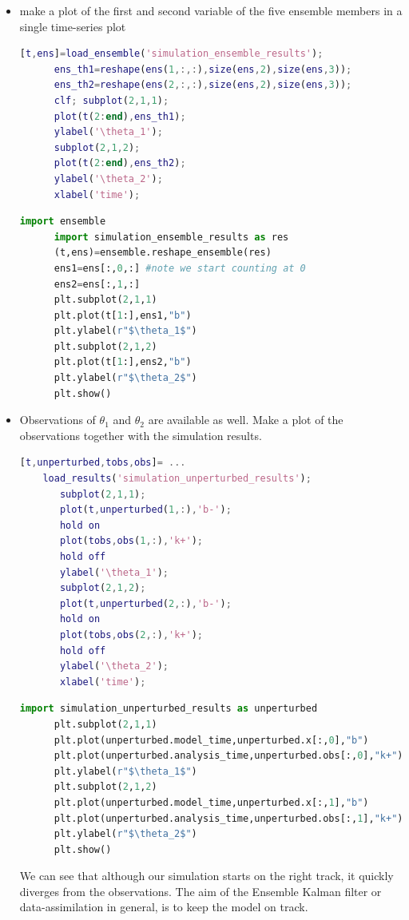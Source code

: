 \begin{itemize}
\begin{itemize}
      \item make a plot of the first and second variable of the five ensemble
      members in a single time-series plot
\ifshowmatlab
      \begin{lstlisting}[language=Matlab,frame=single,caption={Matlab}]
      [t,ens]=load_ensemble('simulation_ensemble_results');
      ens_th1=reshape(ens(1,:,:),size(ens,2),size(ens,3));
      ens_th2=reshape(ens(2,:,:),size(ens,2),size(ens,3));
      clf; subplot(2,1,1);
      plot(t(2:end),ens_th1);
      ylabel('\theta_1');
      subplot(2,1,2);
      plot(t(2:end),ens_th2);
      ylabel('\theta_2');
      xlabel('time');
      \end{lstlisting}
\fi
     
      \begin{lstlisting}[language=Python,frame=single,caption={Python}]
      import ensemble
      import simulation_ensemble_results as res
      (t,ens)=ensemble.reshape_ensemble(res)
      ens1=ens[:,0,:] #note we start counting at 0
      ens2=ens[:,1,:]
      plt.subplot(2,1,1)
      plt.plot(t[1:],ens1,"b")
      plt.ylabel(r"$\theta_1$")
      plt.subplot(2,1,2)
      plt.plot(t[1:],ens2,"b")
      plt.ylabel(r"$\theta_2$")
      plt.show()
      \end{lstlisting}
      
      \item Observations of $\theta_1$ and $\theta_2$ are available as well. Make a plot of
      the observations together with the simulation results.
\ifshowmatlab
      \begin{lstlisting}[language=Matlab,frame=single,caption={Matlab}]
	[t,unperturbed,tobs,obs]= ...
	load_results('simulation_unperturbed_results');
       subplot(2,1,1);
       plot(t,unperturbed(1,:),'b-');
       hold on
       plot(tobs,obs(1,:),'k+');
       hold off
       ylabel('\theta_1');
       subplot(2,1,2);
       plot(t,unperturbed(2,:),'b-');
       hold on
       plot(tobs,obs(2,:),'k+');
       hold off
       ylabel('\theta_2');
       xlabel('time');
      \end{lstlisting}
\fi
      \begin{lstlisting}[language=Python,frame=single,caption={Python}]
      import simulation_unperturbed_results as unperturbed
      plt.subplot(2,1,1)
      plt.plot(unperturbed.model_time,unperturbed.x[:,0],"b") 
      plt.plot(unperturbed.analysis_time,unperturbed.obs[:,0],"k+")
      plt.ylabel(r"$\theta_1$")
      plt.subplot(2,1,2)
      plt.plot(unperturbed.model_time,unperturbed.x[:,1],"b")
      plt.plot(unperturbed.analysis_time,unperturbed.obs[:,1],"k+")
      plt.ylabel(r"$\theta_2$")
      plt.show()
      \end{lstlisting}
      
      We can see that although our simulation starts on the right track, it quickly diverges from the observations.
      The aim of the Ensemble Kalman filter or data-assimilation in general, is to keep the model on track. 
      \end{itemize}

\end{itemize}
